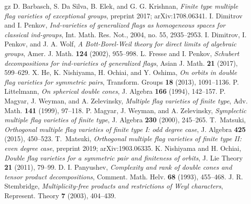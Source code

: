 \documentclass[12pt]{amsart}
\numberwithin{equation}{section}
\theoremstyle{definition}
\begin{document}
\begin{thebibliography}{gz}
 D. Barbasch, S. Da Silva, B. Elek, and G. G. Krishnan,
\emph{Finite type multiple flag varieties of exceptional groups},
preprint 2017; arXiv:1708.06341.
I. Dimitrov and I. Penkov, \emph{Ind-varieties of generalized flags as homogeneous spaces for
classical ind-groups}, Int. Math. Res. Not., 2004, no. 55, 2935--2953.
 I. Dimitrov, I. Penkov, and J. A. Wolf, \emph{A Bott-Borel-Weil theory for direct limits of algebraic groups}, Amer. J. Math. {\bf 124} (2002), 955--998.
 L. Fresse and I. Penkov, \emph{Schubert decompositions for ind-varieties of generalized flags}, Asian J. Math. {\bf 21} (2017), 599--629.
X. He, K. Nishiyama, H. Ochiai, and Y. Oshima,
\emph{On orbits in double flag varieties for symmetric pairs}, 
Transform. Groups {\bf 18} (2013), 1091--1136.
 P. Littelmann, \emph{On spherical double cones}, J. Algebra {\bf 166} (1994), 142--157.
 P. Magyar, J. Weyman, and A. Zelevinsky, \emph{Multiple flag varieties of finite type}, Adv. Math. \textbf{141} (1999), 97--118.
 P. Magyar, J. Weyman, and A. Zelevinsky, \emph{Symplectic multiple flag varieties of finite type}, J. Algebra \textbf{230} (2000), 245--265.
 T.\ Matsuki, \emph{Orthogonal multiple flag varieties of finite type I: odd degree case}, J. Algebra {\bf 425} (2015), 450--523.
 T.\ Matsuki, \emph{Orthogonal multiple flag varieties of finite type II: even degree case}, preprint 2019; arXiv:1903.06335.
K. Nishiyama and H. Ochiai, 
\emph{Double flag varieties for a symmetric pair and finiteness of orbits}, 
J. Lie Theory {\bf 21} (2011), 79--99.
 D. I. Panyushev,
\emph{Complexity and rank of double cones and tensor product decompositions},
Comment. Math. Helv. {\bf 68} (1993), 455--468.
 J. R. Stembridge, \emph{Multiplicity-free products and restrictions of Weyl characters}, Represent. Theory {\bf 7} (2003), 404--439.
\end{thebibliography}
\end{document}
